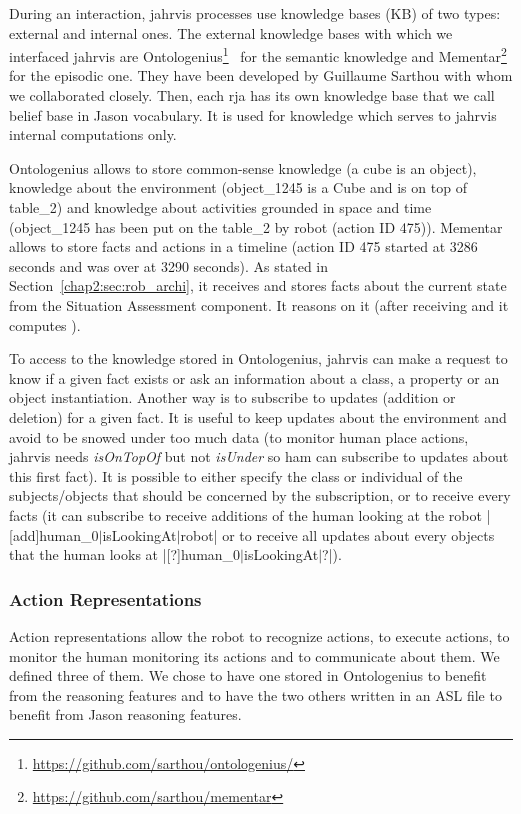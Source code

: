 \documentclass[a4paper,11pt,twoside]{StyleThese}
\begin{document}
During an interaction, \acrshort{jahrvis} processes use knowledge bases (KB) of two types: external and internal ones. The external knowledge bases with which we interfaced \acrshort{jahrvis} are Ontologenius\footnote{\url{https://github.com/sarthou/ontologenius/}}~\cite{sarthou_2019_ontologenius} for the semantic knowledge and Mementar\footnote{\url{https://github.com/sarthou/mementar}} for the episodic one. They have been developed by Guillaume Sarthou with whom we collaborated closely. Then, each \acrshort{rja} has its own knowledge base that we call belief base in Jason vocabulary. It is used for knowledge which serves to \acrshort{jahrvis} internal computations only.

Ontologenius allows to store common-sense knowledge (\eg a cube is an object), knowledge about the environment (\eg object\_1245 is a Cube and is on top of table\_2) and knowledge about activities grounded in space and time (\eg object\_1245 has been put on the table\_2 by robot (action ID 475)). Mementar allows to store facts and actions in a timeline (\eg action ID 475 started at 3286 seconds and was over at 3290 seconds). As stated in Section~\ref{chap2:sec:rob_archi}, it receives and stores facts about the current state from the Situation Assessment component. It reasons on it (\eg after receiving  and it computes ). 

To access to the knowledge stored in Ontologenius, \acrshort{jahrvis} can make a request to know if a given fact exists or ask an information about a class, a property or an object instantiation. Another way is to subscribe to updates (addition or deletion) for a given fact. It is useful to keep updates about the environment and avoid to be snowed under too much data (\eg to monitor human place actions, \acrshort{jahrvis} needs \textit{isOnTopOf} but not \textit{isUnder} so \acrlong{ham} can subscribe to updates about this first fact). It is possible to either specify the class or individual of the subjects/objects that should be concerned by the subscription, or to receive every facts (\eg it can subscribe to receive additions of the human looking at the robot |[add]human_0$\lvert$isLookingAt$\lvert$robot| or to receive all updates about every objects that the human looks at |[?]human_0$\lvert$isLookingAt$\lvert$?|).

\subsubsection{Action Representations}\label{chap2:subsubsec:action_rep}
Action representations allow the robot to recognize actions, to execute actions, to monitor the human monitoring its actions and to communicate about them. We defined three of them. We chose to have one stored in Ontologenius to benefit from the reasoning features and to have the two others written in an ASL file to benefit from Jason reasoning features.
\end{document}
